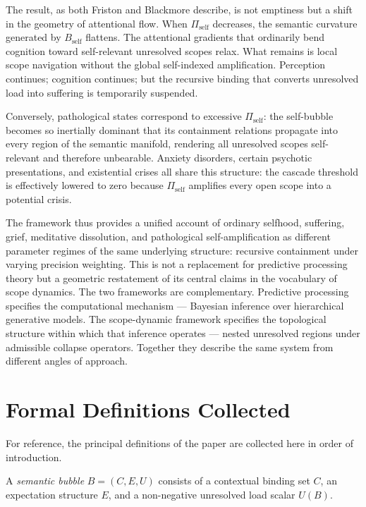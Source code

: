 \documentclass[12pt, a4paper]{article}
\theoremstyle{plain}
\theoremstyle{definition}
\theoremstyle{remark}
\begin{document}
The result, as both Friston and Blackmore describe, is not emptiness but a
shift in the geometry of attentional flow. When $\Pi_{\text{self}}$ decreases,
the semantic curvature generated by $B_{\text{self}}$ flattens. The attentional
gradients that ordinarily bend cognition toward self-relevant unresolved scopes
relax. What remains is local scope navigation without the global self-indexed
amplification. Perception continues; cognition continues; but the recursive
binding that converts unresolved load into suffering is temporarily suspended.

Conversely, pathological states correspond to excessive $\Pi_{\text{self}}$:
the self-bubble becomes so inertially dominant that its containment relations
propagate into every region of the semantic manifold, rendering all
unresolved scopes self-relevant and therefore unbearable. Anxiety disorders,
certain psychotic presentations, and existential crises all share this
structure: the cascade threshold is effectively lowered to zero because
$\Pi_{\text{self}}$ amplifies every open scope into a potential crisis.

The framework thus provides a unified account of ordinary selfhood, suffering,
grief, meditative dissolution, and pathological self-amplification as different
parameter regimes of the same underlying structure: recursive containment under
varying precision weighting. This is not a replacement for predictive
processing theory but a geometric restatement of its central claims in the
vocabulary of scope dynamics. The two frameworks are complementary. Predictive
processing specifies the computational mechanism — Bayesian inference over
hierarchical generative models. The scope-dynamic framework specifies the
topological structure within which that inference operates — nested unresolved
regions under admissible collapse operators. Together they describe the same
system from different angles of approach.

\appendix

\section{Formal Definitions Collected}

For reference, the principal definitions of the paper are collected here in
order of introduction.

A \emph{semantic bubble} $B = (C, E, U)$ consists of a contextual binding set
$C$, an expectation structure $E$, and a non-negative unresolved load scalar
$U(B)$.
\end{document}

